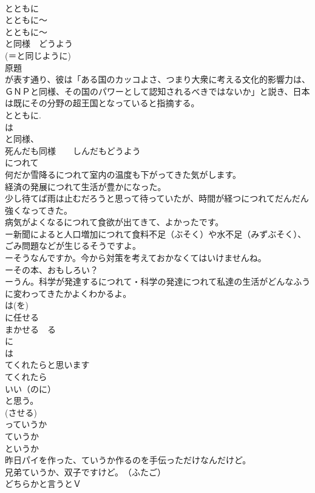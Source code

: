 \documentclass[8pt]{extreport}
\begin{document}
\begin{CJK}{UTF8}{min}
\\	とともに
\\	とともに～
\\	とともに～
\\	と同様　どうよう
\\	(＝と同じように)
\\	原題
\\	が表す通り、彼は「ある国のカッコよさ、つまり大衆に考える文化的影響力は、ＧＮＰと同様、その国のパワーとして認知されるべきではないか」と説き、日本は既にその分野の超王国となっていると指摘する。
\\	とともに.
\\	は
\\	と同様、
\\	死んだも同様　　しんだもどうよう
\\	につれて
\\	何だか雪降るにつれて室内の温度も下がってきた気がします。
\\	経済の発展につれて生活が豊かになった。
\\	少し待てば雨は止むだろうと思って待っていたが、時間が経つにつれてだんだん強くなってきた。
\\	病気がよくなるにつれて食欲が出てきて、よかったです。
\\	ー新聞によると人口増加につれて食料不足（ぶそく）や水不足（みずぶそく）、ごみ問題などが生じるそうですよ。
\\	ーそうなんですか。今から対策を考えておかなくてはいけませんね。
\\	ーその本、おもしろい？
\\	ーうん。科学が発達するにつれて・科学の発達につれて私達の生活がどんなふうに変わってきたかよくわかるよ。	
\\	は(を)
\\	に任せる
\\	まかせる　る
\\	に 
\\	は 
\\	てくれたらと思います
\\	てくれたら
\\	いい（のに）
\\	と思う。
\\	(させる) 
\\	っていうか
\\	ていうか
\\	というか 
\\	昨日パイを作った、ていうか作るのを手伝っただけなんだけど。
\\	兄弟ていうか、双子ですけど。　（ふたご）
\\	どちらかと言うとＶ

\end{CJK}
\end{document}
